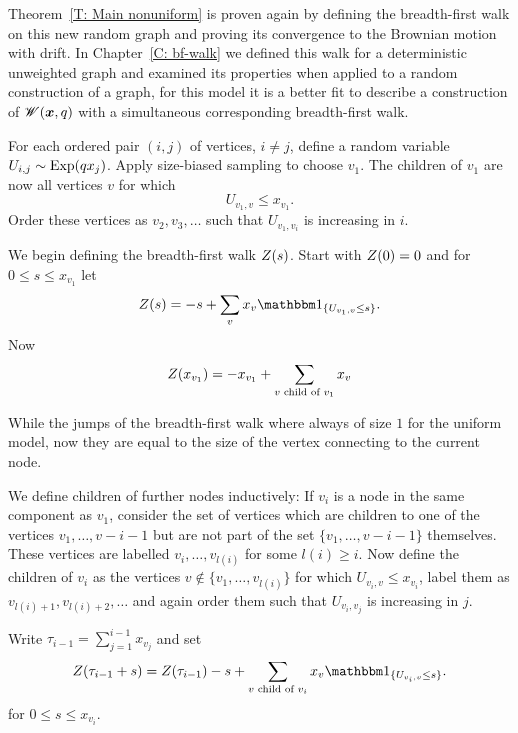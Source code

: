 Theorem~\ref{T: Main nonuniform} is proven again by defining the breadth-first walk on this new random graph
and proving its convergence to the Brownian motion with drift.
In Chapter~\ref{C: bf-walk} we defined this walk for a deterministic unweighted graph 
and examined its properties when applied to a random construction of a graph,
for this model it is a better fit to describe a construction of $\mathscr{W}(\boldsymbol{x}, q)$ with a simultaneous corresponding breadth-first walk.

For each ordered pair $(i, j)$ of vertices, $i \neq j$, define a random variable $U_{i,j} \sim \operatorname*{Exp}(q x_j)$.
Apply size-biased sampling to choose $v_1$.
The children of $v_1$ are now all vertices $v$ for which
\begin{equation}
	U_{v_1, v} \leq x_{v_1}.
\end{equation}
Order these vertices as $v_2, v_3, \dots$ such that $U_{v_1, v_i}$ is increasing in $i$.

We begin defining the breadth-first walk $Z(s)$.
Start with $Z(0) = 0$ and for $0 \leq s \leq x_{v_1}$ let
\begin{equation}
	\bfw(s) = -s + \sum_{v} x_v \Ind{\{U_{v_1, v} \leq s\}}.
\end{equation}
Now
\begin{equation}
	Z(x_{v_1}) = -x_{v_1} + \sum_{\text{$v$ child of $v_1$}} x_v
\end{equation}


While the jumps of the breadth-first walk where always of size $1$ for the uniform model,
now they are equal to the size of the vertex connecting to the current node.

We define children of further nodes inductively:
If $v_i$ is a node in the same component as $v_1$,
consider the set of vertices which are children to one of the vertices $v_1, \dots, v-{i-1}$
but are not part of the set $\{v_1, \dots, v-{i-1}\}$ themselves.
These vertices are labelled $v_i, \dots, v_{l(i)}$ for some $l(i) \geq i$.
Now define the children of $v_i$ as the vertices 
$v \notin \{v_1, \dots, v_{l(i)}\}$ for which $U_{v_i, v} \leq x_{v_i}$,
label them as $v_{l(i) + 1}, v_{l(i) + 2}, \dots$ 
and again order them such that $U_{v_i, v_j}$ is increasing in $j$.
 
Write $\tau_{i-1} = \sum_{j = 1}^{i-1} x_{v_j}$ and set
\begin{equation}
	\bfw(\tau_{i-1} + s) = \bfw(\tau_{i-1}) - s + \sum_{\text{$v$ child of $v_i$}} x_v \Ind{\{U_{v_i, v} \leq s\}}.
\end{equation}
for $0 \leq s \leq x_{v_i}$.

